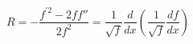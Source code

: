 \begin{equation}
R=-\frac{f^{'2} - 2 f f''}{2f^2} = \frac{1}{\sqrt{f}} \frac{d}{dx} \left(  \frac{1}{\sqrt{f}} \frac{df}{dx}\right)
\end{equation}

